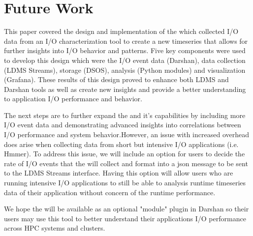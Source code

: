 \section{Future Work}
\label{sec:conclusion}
This paper covered the \Darshan design and implementation of the \connector which collected I/O data from an I/O characterization tool to create a new timeseries that allows for further insights into I/O behavior and patterns. Five key components were used to develop this design which were the I/O event data (Darshan), data collection (LDMS Streams), storage (DSOS), analysis (Python modules) and visualization (Grafana).
These results of this design proved to enhance both LDMS and Darshan tools as well as create new insights and provide a better understanding to application I/O performance and behavior. 

The next steps are to further expand the \connector and it's capabilities by including more I/O event data and demonstrating advanced insights into correlations between I/O performance and system behavior.However, an issue with increased overhead does arise when collecting data from short but intensive I/O applications  (i.e. Hmmer). 
To address this issue, we will include an option for users to decide the rate of I/O events that the \connector will collect and format into a json message to be sent to the LDMS Streams interface. Having this option will allow users who are running intensive I/O applications to still be able to analysis runtime timeseries data of their application without concern of the runtime performance. 

We hope the \Darshan will be available as an optional "module" plugin in Darshan so their users may use this tool to better understand their applications I/O performance across HPC systems and clusters. 



